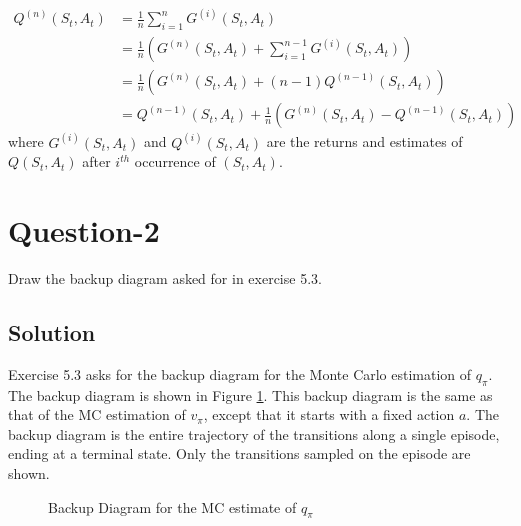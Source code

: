\documentclass[11pt]{article}
\begin{document}
    \begin{align*}
        Q^{(n)}(S_{t}, A_{t}) &= \frac{1}{n} \sum_{i=1}^{n} G^{(i)}(S_{t}, A_{t}) \\
        &= \frac{1}{n} \left( G^{(n)}(S_{t}, A_{t}) + \sum_{i=1}^{n-1} G^{(i)}(S_{t}, A_{t}) \right) \\
        &= \frac{1}{n} \left( G^{(n)}(S_{t}, A_{t}) + (n-1) Q^{(n-1)}(S_{t}, A_{t}) \right) \\
        &= Q^{(n-1)}(S_{t}, A_{t}) + \frac{1}{n} \left( G^{(n)}(S_{t}, A_{t}) - Q^{(n-1)}(S_{t}, A_{t}) \right)
    \end{align*}
    where $G^{(i)}(S_{t}, A_{t})$ and $Q^{(i)}(S_{t}, A_{t})$ are the returns and estimates of $Q(S_{t}, A_{t})$ after $i^{th}$ occurrence of $(S_{t}, A_{t})$.

    \section*{Question-2}
    Draw the backup diagram asked for in exercise 5.3.

    \subsection*{Solution}
    Exercise 5.3 asks for the backup diagram for the Monte Carlo estimation of $q_{\pi}$. The backup diagram is shown in Figure \ref{fig:backup-diagram}.
    This backup diagram is the same as that of the MC estimation of $v_{\pi}$, except that it starts with a fixed action $a$. The backup diagram is
    the entire trajectory of the transitions along a single episode, ending at a terminal state. Only the transitions sampled on the episode are shown.
    \begin{figure}[htbp]
        \centering
        \caption{Backup Diagram for the MC estimate of $q_{\pi}$}
        \label{fig:backup-diagram}
    \end{figure}
\end{document}
